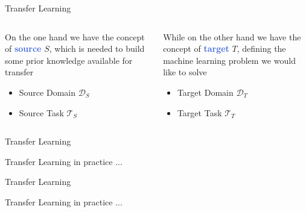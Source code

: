 \documentclass{beamer}
\begin{document}
\begin{frame}{Transfer Learning}
	


	\begin{columns}
		\begin{column}{.5\textwidth}
			On the one hand we have the concept of \textcolor{RoyalBlue}{\textbf{source}} $S$, which is needed to build some prior knowledge available for transfer
		
		\bigskip
		\begin{itemize}
			\item	Source Domain $\mathcal{D}_S$
			\item	Source Task $\mathcal{T}_S$
		\end{itemize}

		\end{column}
		
		\begin{column}{.5\textwidth}
			While on the other hand we have the concept of \textcolor{RoyalBlue}{\textbf{target}} $T$, defining the machine learning problem we would like to solve
		
		\bigskip
		\begin{itemize}
			\item Target Domain $\mathcal{D}_T$
			\item Target Task $\mathcal{T}_T$
		\end{itemize}


		\end{column}
		
	\end{columns}



\end{frame}


\begin{frame}{Transfer Learning}
	
	\bigskip
	Transfer Learning in practice ...
	\bigskip
	

\end{frame}


\begin{frame}{Transfer Learning}
	
	\bigskip
	Transfer Learning in practice ...
	\bigskip
	

\end{frame}
\end{document}
